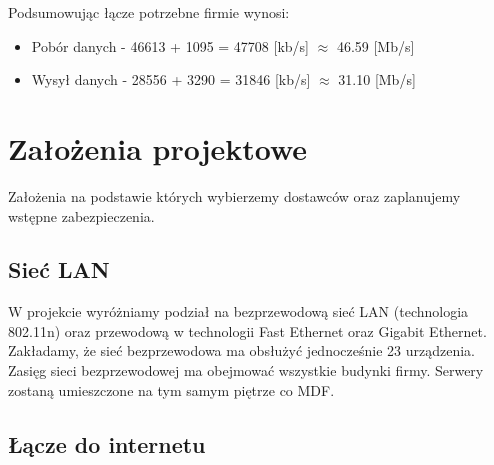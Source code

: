\documentclass[a4paper,12pt]{extarticle}  %
\begin{document}
\begin{table}[H]
	\centering
	\caption{Szacowane łącze internetowe serwerów}
	\label{tab:usage_server}%
\end{table}%

Podsumowując łącze potrzebne firmie wynosi:
\begin{itemize}
	\item Pobór danych - 46613 + 1095 = 47708 [kb/s] $\approx$ 46.59 [Mb/s]
	\item Wysył danych - 28556 + 3290 = 31846 [kb/s] $\approx$ 31.10 [Mb/s]
\end{itemize}

\section{Założenia projektowe}
Założenia na podstawie których wybierzemy dostawców oraz zaplanujemy wstępne zabezpieczenia.
\subsection{Sieć LAN}
W projekcie wyróżniamy podział na bezprzewodową sieć LAN
(technologia 802.11n) oraz przewodową w technologii
Fast Ethernet oraz Gigabit Ethernet.
Zakładamy, że sieć bezprzewodowa ma obsłużyć jednocześnie
23 urządzenia. Zasięg sieci bezprzewodowej ma obejmować
wszystkie budynki firmy.
Serwery zostaną umieszczone na tym samym piętrze co MDF.

\subsection{Łącze do internetu}
\end{document}
